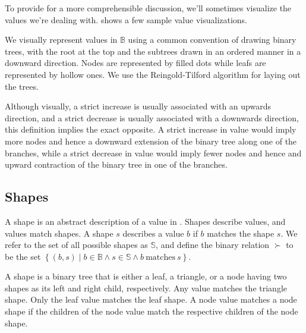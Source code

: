 To provide for a more comprehensible discussion, we'll sometimes visualize the
values we're dealing with.  shows a few
sample value visualizations.

\begin{definition}\label{definition:value-visualization} We visually represent
values in $\mathbb{B}$ using a common convention of drawing binary trees, with
the root at the top and the subtrees drawn in an ordered manner in a downward
direction. Nodes are represented by filled dots while leafs are represented by
hollow ones. We use the Reingold-Tilford algorithm\cite{reingold-tilford} for
laying out the trees.\end{definition}


Although visually, a strict increase is usually associated with an upwards
direction, and a strict decrease is usually associated with a downwards
direction, this definition implies the exact opposite. A strict increase in
value would imply more nodes and hence a downward extension of the binary tree
along one of the branches, while a strict decrease in value would imply fewer
nodes and hence and upward contraction of the binary tree in one of the
branches.

\subsection{Shapes}

\begin{definition}\label{definition:shape} A shape is an abstract description
of a value in \D{}. Shapes describe values, and values match shapes. A shape
$s$ describes a value $b$ if $b$ matches the shape $s$. We refer to the set of
all possible shapes as $\mathbb{S}$, and define the binary relation $\succ$ to
be the set $\left\{(b,s)\mid b\in\mathbb{B} \wedge s\in\mathbb{S} \wedge b\
\text{matches}\ s\right\}$.\end{definition}

\begin{definition}\label{definition:value-matches-shape} A shape is a binary
tree that is either a leaf, a triangle, or a node having two shapes as its left
and right child, respectively. Any value matches the triangle shape. Only the
leaf value matches the leaf shape. A node value matches a node shape if the
children of the node value match the respective children of the node
shape.\end{definition}

